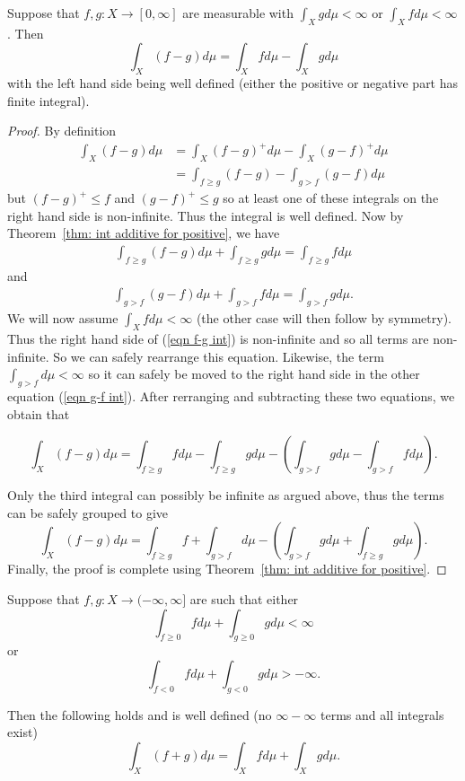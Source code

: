 \documentclass[twoside, a4paper, 10pt]{amsart}
\begin{document}
\begin{lemma} Suppose that $f,g:X \to [0,\infty]$ are measurable with $\int_X g d\mu < \infty$ or $\int_X f d\mu < \infty$. Then $$\int_X (f-g) d\mu = \int_X f d\mu - \int_X g d\mu$$ with the left hand side being well defined (either the positive or negative part has finite integral). \end{lemma}

\begin{proof} By definition 
\begin{align*} \int_X (f-g) d\mu &= \int_X (f-g)^+ d\mu - \int_X (g-f)^+ d\mu \\
&= \int_{f \geq g} (f-g) - \int_{g > f} (g-f) d\mu
\end{align*} 
but $(f-g)^+ \leq f$ and $(g-f)^+ \leq g$ so at least one of these integrals on the right hand side is non-infinite. Thus the integral is well defined.
Now by Theorem~\ref{thm: int additive for positive}, we have 
\begin{align} \label{eqn f-g int} \int_{f \geq g} (f-g)d\mu + \int_{f \geq g} g d\mu = \int_{f \geq g} f d\mu \end{align}
and 
\begin{align} \label{eqn g-f int} \int_{g > f} (g-f) d\mu + \int_{g>f} f d\mu = \int_{g>f} g d\mu.  \end{align}
We will now assume $\int_X f d\mu < \infty$ (the other case will then follow by symmetry).
Thus the right hand side of (\ref{eqn f-g int}) is non-infinite and so all terms are non-infinite. So we can safely rearrange this equation. Likewise, the term $\int_{g>f} d \mu <\infty$ so it can safely be moved to the right hand side in the other equation (\ref{eqn g-f int}). After rerranging and subtracting these two equations, we obtain that 

$$\int_X (f-g) d\mu = \int_{f \geq g} f d\mu - \int_{f \geq g} g d\mu - \left(\int_{g>f} g d\mu -\int_{g>f} f d\mu\right).  $$

Only the third integral can possibly be infinite as argued above, thus the terms can be safely grouped to give $$\int_X (f-g) d\mu = \int_{f\geq g} f + \int_{g>f} d \mu - \left(\int_{g>f} g d\mu + \int_{f \geq g} g d\mu\right).$$ Finally, the proof is complete using Theorem~\ref{thm: int additive for positive}. \end{proof}

\begin{thm} Suppose that $f,g:X \to (-\infty, \infty]$ are such that either $$\int_{f \geq 0} f d\mu + \int_{g \geq 0} g d\mu < \infty$$ or $$\int_{f < 0} f d\mu + \int_{g < 0} g d\mu > -\infty.$$

Then the following holds and is well defined (no $\infty - \infty$ terms and all integrals exist) $$\int_X (f+g) d\mu = \int_X f d\mu + \int_X g d\mu.$$

\end{thm}
\end{document}
